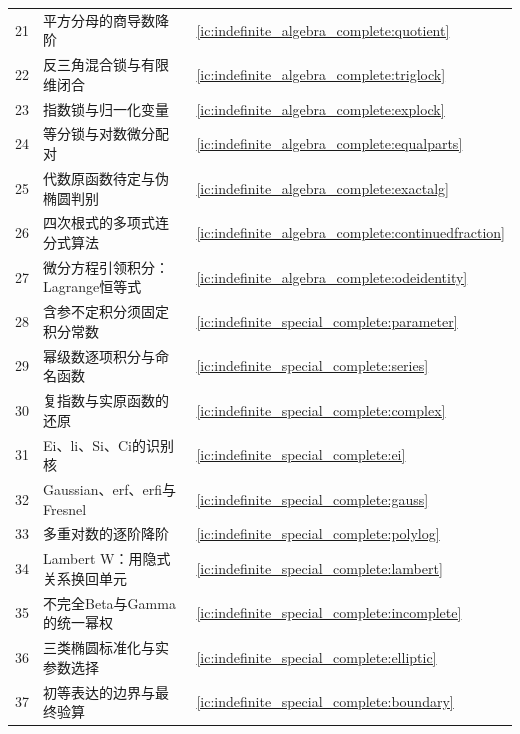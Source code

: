 \begin{longtable}{p{9mm}p{91mm}p{23mm}}
21&平方分母的商导数降阶&\ref{ic:indefinite_algebra_complete:quotient}\\
22&反三角混合锁与有限维闭合&\ref{ic:indefinite_algebra_complete:triglock}\\
23&指数锁与归一化变量&\ref{ic:indefinite_algebra_complete:explock}\\
24&等分锁与对数微分配对&\ref{ic:indefinite_algebra_complete:equalparts}\\
25&代数原函数待定与伪椭圆判别&\ref{ic:indefinite_algebra_complete:exactalg}\\
26&四次根式的多项式连分式算法&\ref{ic:indefinite_algebra_complete:continuedfraction}\\
27&微分方程引领积分：Lagrange恒等式&\ref{ic:indefinite_algebra_complete:odeidentity}\\
28&含参不定积分须固定积分常数&\ref{ic:indefinite_special_complete:parameter}\\
29&幂级数逐项积分与命名函数&\ref{ic:indefinite_special_complete:series}\\
30&复指数与实原函数的还原&\ref{ic:indefinite_special_complete:complex}\\
31&Ei、li、Si、Ci的识别核&\ref{ic:indefinite_special_complete:ei}\\
32&Gaussian、erf、erfi与Fresnel&\ref{ic:indefinite_special_complete:gauss}\\
33&多重对数的逐阶降阶&\ref{ic:indefinite_special_complete:polylog}\\
34&Lambert W：用隐式关系换回单元&\ref{ic:indefinite_special_complete:lambert}\\
35&不完全Beta与Gamma的统一幂权&\ref{ic:indefinite_special_complete:incomplete}\\
36&三类椭圆标准化与实参数选择&\ref{ic:indefinite_special_complete:elliptic}\\
37&初等表达的边界与最终验算&\ref{ic:indefinite_special_complete:boundary}\\
\bottomrule\end{longtable}

